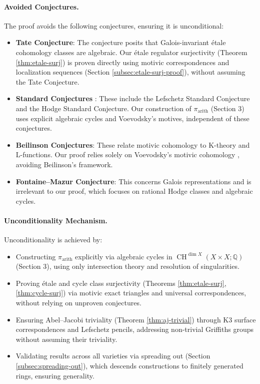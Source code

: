 \documentclass[11pt]{article}
\DeclareMathOperator{\CH}{CH}
\begin{document}
\paragraph{Avoided Conjectures.}
The proof avoids the following conjectures, ensuring it is unconditional:
\begin{itemize}
    \item \textbf{Tate Conjecture}: The conjecture posits that Galois-invariant étale cohomology classes are algebraic. Our étale regulator surjectivity (Theorem \ref{thm:etale-surj}) is proven directly using motivic correspondences and localization sequences (Section \ref{subsec:etale-surj-proof}), without assuming the Tate Conjecture.
    \item \textbf{Standard Conjectures} \cite{grothendieck1969}: These include the Lefschetz Standard Conjecture and the Hodge Standard Conjecture. Our construction of \(\pi_{\mathrm{arith}}\) (Section 3) uses explicit algebraic cycles and Voevodsky’s motives, independent of these conjectures.
    \item \textbf{Beilinson Conjectures}: These relate motivic cohomology to K-theory and L-functions. Our proof relies solely on Voevodsky’s motivic cohomology \cite{voevodsky2000}, avoiding Beilinson’s framework.
    \item \textbf{Fontaine–Mazur Conjecture}: This concerns Galois representations and is irrelevant to our proof, which focuses on rational Hodge classes and algebraic cycles.
\end{itemize}

\paragraph{Unconditionality Mechanism.}
Unconditionality is achieved by:
\begin{itemize}
    \item Constructing \(\pi_{\mathrm{arith}}\) explicitly via algebraic cycles in \(\CH^{\dim X}(X \times X; \mathbb{Q})\) (Section 3), using only intersection theory and resolution of singularities.
    \item Proving étale and cycle class surjectivity (Theorems \ref{thm:etale-surj}, \ref{thm:cycle-surj}) via motivic exact triangles and universal correspondences, without relying on unproven conjectures.
    \item Ensuring Abel–Jacobi triviality (Theorem \ref{thm:aj-trivial}) through K3 surface correspondences and Lefschetz pencils, addressing non-trivial Griffiths groups without assuming their triviality.
    \item Validating results across all varieties via spreading out (Section \ref{subsec:spreading-out}), which descends constructions to finitely generated rings, ensuring generality.
\end{itemize}
\end{document}
